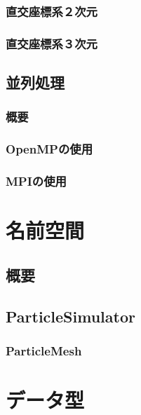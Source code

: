 \documentclass[12pt,a4paper]{jarticle}
\begin{document}
\subsubsection{直交座標系２次元}

\subsubsection{直交座標系３次元}

\subsection{並列処理}

\subsubsection{概要}

\subsubsection{OpenMPの使用}

\subsubsection{MPIの使用}

\newpage

\section{名前空間}

\subsection{概要}

\subsection{ParticleSimulator}

\subsubsection{ParticleMesh}

\newpage

\section{データ型}
\end{document}
